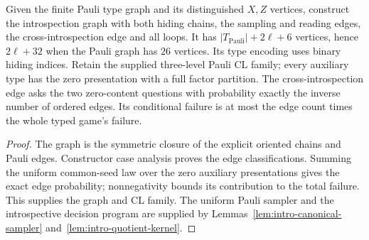 \begin{lemma}
\label{lem:intro-type-presentation}
\leanok
Given the finite Pauli type graph and its distinguished $X,Z$ vertices, construct
the introspection graph with both hiding chains, the sampling and reading edges,
the cross-introspection edge and all loops. It has $|T_{\mathrm{Pauli}}|+2\ell+6$
vertices, hence $2\ell+32$ when the Pauli graph has $26$ vertices. Its type encoding
uses binary hiding indices. Retain the supplied three-level Pauli CL family;
every auxiliary type has the zero presentation with a full factor partition.
The cross-introspection edge asks the two zero-content questions with probability
exactly the inverse number of ordered edges. Its conditional failure is at most
the edge count times the whole typed game's failure.
\end{lemma}
\begin{proof}
\leanok
The graph is the symmetric closure of the explicit oriented chains and Pauli
edges. Constructor case analysis proves the edge classifications. Summing the
uniform common-seed law over the zero auxiliary presentations gives the exact
edge probability; nonnegativity bounds its contribution to the total failure.
This supplies the graph and CL family. The uniform Pauli sampler and the
introspective decision program are supplied by
Lemmas~\ref{lem:intro-canonical-sampler} and~\ref{lem:intro-quotient-kernel}.
\end{proof}

